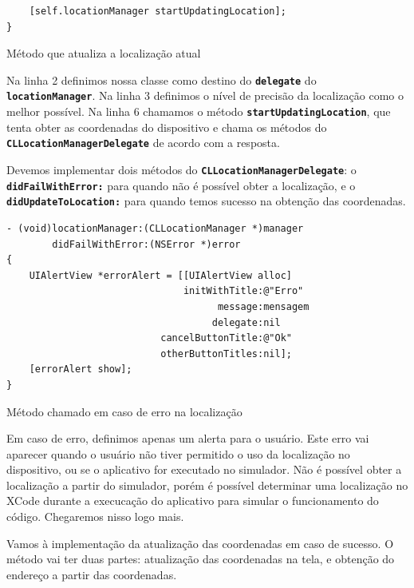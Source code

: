 \documentclass[a4paper,12pt,brazil,doubleside]{book}
\begin{document}
\begin{singlespace}
\begin{listing}[H]
\begin{verbatim}
    [self.locationManager startUpdatingLocation];
}
\end{verbatim}
\caption{Método que atualiza a localização atual}
\end{listing}


Na linha 2 definimos nossa classe como destino do \texttt{\textbf{delegate}} do \texttt{\textbf{locationManager}}. Na linha 3 definimos o nível de precisão da localização como o melhor possível. Na linha 6 chamamos o método \texttt{\textbf{startUpdatingLocation}}, que tenta obter as coordenadas do dispositivo e chama os métodos do \texttt{\textbf{CLLocationManagerDelegate}} de acordo com a resposta.

Devemos implementar dois métodos do \texttt{\textbf{CLLocationManagerDelegate}}: o\\ \texttt{\textbf{didFailWithError:}} para quando não é possível obter a localização, e o\\ \texttt{\textbf{didUpdateToLocation:}} para quando temos sucesso na obtenção das coordenadas.

\begin{listing}[H]
\begin{verbatim}
- (void)locationManager:(CLLocationManager *)manager
        didFailWithError:(NSError *)error
{
    UIAlertView *errorAlert = [[UIAlertView alloc]
                               initWithTitle:@"Erro"
                                     message:mensagem
                                    delegate:nil
                           cancelButtonTitle:@"Ok"
                           otherButtonTitles:nil];
    [errorAlert show];
}
\end{verbatim}
\caption{Método chamado em caso de erro na localização}
\end{listing}


Em caso de erro, definimos apenas um alerta para o usuário. Este erro vai aparecer quando o usuário não tiver permitido o uso da localização no dispositivo, ou se o aplicativo for executado no simulador. Não é possível obter a localização a partir do simulador, porém é possível determinar uma localização no XCode durante a execucação do aplicativo para simular o funcionamento do código. Chegaremos nisso logo mais.

Vamos à implementação da atualização das coordenadas em caso de sucesso. O método vai ter duas partes: atualização das coordenadas na tela, e obtenção do endereço a partir das coordenadas.


\end{singlespace}
\end{document}
